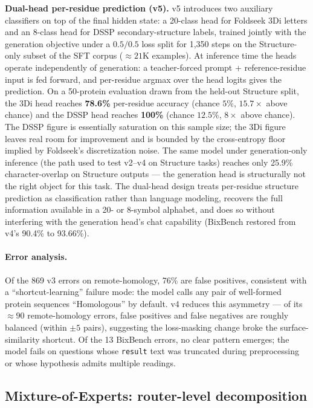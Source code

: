 \documentclass[11pt]{article}
\begin{document}
\textbf{Dual-head per-residue prediction (v5).} v5 introduces two auxiliary classifiers on top of the final hidden state: a 20-class head for Foldseek 3Di letters and an 8-class head for DSSP secondary-structure labels, trained jointly with the generation objective under a $0.5 / 0.5$ loss split for 1{,}350 steps on the Structure-only subset of the SFT corpus ($\approx 21$K examples). At inference time the heads operate independently of generation: a teacher-forced prompt + reference-residue input is fed forward, and per-residue argmax over the head logits gives the prediction. On a 50-protein evaluation drawn from the held-out Structure split, the 3Di head reaches \textbf{78.6\%} per-residue accuracy (chance $5\%$, $15.7\times$ above chance) and the DSSP head reaches \textbf{100\%} (chance $12.5\%$, $8\times$ above chance). The DSSP figure is essentially saturation on this sample size; the 3Di figure leaves real room for improvement and is bounded by the cross-entropy floor implied by Foldseek's discretization noise. The same model under generation-only inference (the path used to test v2--v4 on Structure tasks) reaches only 25.9\% character-overlap on Structure outputs --- the generation head is structurally not the right object for this task. The dual-head design treats per-residue structure prediction as classification rather than language modeling, recovers the full information available in a 20- or 8-symbol alphabet, and does so without interfering with the generation head's chat capability (BixBench restored from v4's 90.4\% to 93.66\%).

\paragraph{Error analysis.} Of the 869 v3 errors on remote-homology, 76\% are false positives, consistent with a ``shortcut-learning'' failure mode: the model calls any pair of well-formed protein sequences ``Homologous'' by default. v4 reduces this asymmetry --- of its $\approx 90$ remote-homology errors, false positives and false negatives are roughly balanced (within $\pm 5$ pairs), suggesting the loss-masking change broke the surface-similarity shortcut. Of the 13 BixBench errors, no clear pattern emerges; the model fails on questions whose \texttt{result} text was truncated during preprocessing or whose hypothesis admits multiple readings.

\subsection{Mixture-of-Experts: router-level decomposition}
\label{sec:moe}
\end{document}

